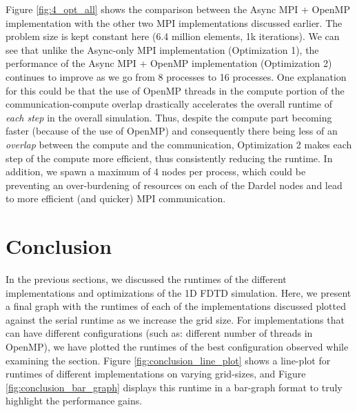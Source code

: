 \documentclass[a4paper,10pt]{article}
\begin{document}
Figure \ref{fig:4_opt_all} shows the comparison between the Async MPI + OpenMP implementation with the other two MPI implementations discussed earlier. The problem size is kept constant here (6.4 million elements, 1k iterations). We can see that unlike the Async-only MPI implementation (Optimization 1), the performance of the Async MPI + OpenMP implementation (Optimization 2) continues to improve as we go from 8 processes to 16 processes. One explanation for this could be that the use of OpenMP threads in the compute portion of the communication-compute overlap drastically accelerates the overall runtime of \textit{each step} in the overall simulation. Thus, despite the compute part becoming faster (because of the use of OpenMP) and consequently there being less of an \textit{overlap} between the compute and the communication, Optimization 2 makes each step of the compute more efficient, thus consistently reducing the runtime. In addition, we spawn a maximum of 4 nodes per process, which could be preventing an over-burdening of resources on each of the Dardel nodes and lead to more efficient (and quicker) MPI communication.

\section{Conclusion}
In the previous sections, we discussed the runtimes of the different implementations and optimizations of the 1D FDTD simulation. Here, we present a final graph with the runtimes of each of the implementations discussed plotted against the serial runtime as we increase the grid size. For implementations that can have different configurations (such as: different number of threads in OpenMP), we have plotted the runtimes of the best configuration observed while examining the section. Figure \ref{fig:conclusion_line_plot} shows a line-plot for runtimes of different implementations on varying grid-sizes, and Figure \ref{fig:conclusion_bar_graph} displays this runtime in a bar-graph format to truly highlight the performance gains.
\end{document}
